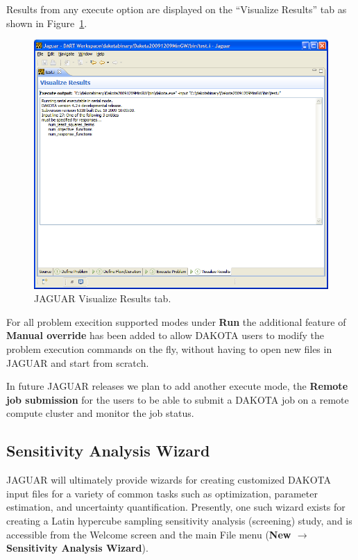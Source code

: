 Results from any execute option are displayed on the ``Visualize
Results'' tab as shown in Figure~\ref{fig:input:jaguar_visualize}.

\begin{figure}[htbp]
  \centering
  \includegraphics[scale=0.4]{images/jaguar_visualize}
  \caption{JAGUAR Visualize Results tab.}
  \label{fig:input:jaguar_visualize}
\end{figure}


For all problem execition supported modes under {\bf Run} the additional feature of 
{\bf Manual override} has been added to allow DAKOTA users to modify the problem execution 
commands on the fly, without having to open new files in JAGUAR and start from scratch. 


In future JAGUAR releases we plan to add another execute mode, the {\bf Remote job submission} for the users to be able to submit a DAKOTA job on a remote
compute cluster and monitor the job status.


\subsection{Sensitivity Analysis Wizard}

JAGUAR will ultimately provide wizards for creating customized DAKOTA
input files for a variety of common tasks such as optimization,
parameter estimation, and uncertainty quantification.  Presently, one
such wizard exists for creating a Latin hypercube sampling sensitivity
analysis (screening) study, and is accessible from the Welcome screen
and the main File menu ({\bf New $\rightarrow$ Sensitivity Analysis
Wizard}).

